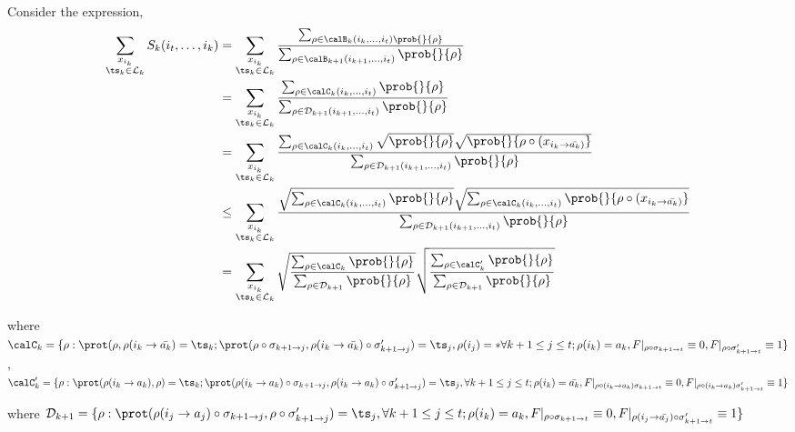 Consider the expression, 
    \begin{align*}
        \sum_{\substack{x_{i_k}\\ \ts_k \in \mathcal{L}_k }}S_k(i_t ,\ldots, i_k) 
        &= \sum_{\substack{x_{i_k}\\ \ts_k \in \mathcal{L}_k }} \frac{\sum_{\rho \in \calB_k(i_k ,\ldots, i_t) \prob{}{\rho}}}{\sum_{\rho \in \calB_{k+1}(i_{k+1} ,\ldots, i_t)}\prob{}{\rho}}\\
        &= \sum_{\substack{x_{i_k}\\ \ts_k \in \mathcal{L}_k }} \frac{\sum_{\rho \in \calC_k(i_k ,\ldots, i_t)} \prob{}{\rho}}{\sum_{\rho \in \calD_{k+1}(i_{k+1} ,\ldots, i_t)}\prob{}{\rho}}\\
        &= \sum_{\substack{x_{i_k}\\ \ts_k \in \mathcal{L}_k }} \frac{\sum_{\rho \in \calC_k(i_k ,\ldots, i_t)} \sqrt{\prob{}{\rho}}\sqrt{\prob{}{\rho \circ (x_{i_k \to \bar{a_k})}}}}{\sum_{\rho \in \calD_{k+1}(i_{k+1} ,\ldots, i_t)}\prob{}{\rho}}\\
        &\leq \sum_{\substack{x_{i_k}\\ \ts_k \in \mathcal{L}_k }} \frac{ \sqrt{\sum_{\rho \in \calC_k(i_k ,\ldots, i_t)}\prob{}{\rho}}\sqrt{\sum_{\rho \in \calC_k(i_k ,\ldots, i_t)}\prob{}{\rho \circ (x_{i_k \to \bar{a_k})}}}}{\sum_{\rho \in \calD_{k+1}(i_{k+1} ,\ldots, i_t)}\prob{}{\rho}}\\
        &= \sum_{\substack{x_{i_k}\\ \ts_k \in \mathcal{L}_k }} 
        \sqrt{\frac{\sum_{\rho \in \calC_k}\prob{}{\rho}}{{\sum_{\rho \in \calD_{k+1}}\prob{}{\rho}}}} \sqrt{\frac{\sum_{\rho \in \calC_k'}\prob{}{\rho}}{\sum_{\rho \in \calD_{k+1}}\prob{}{\rho}}}  
    \end{align*}
 
where $\calC_k = \Ck{k}$,\\ 
$\calC_k' = \Ckprime{k}$

where $\calD_{k+1} = \Dk{k+1}$





